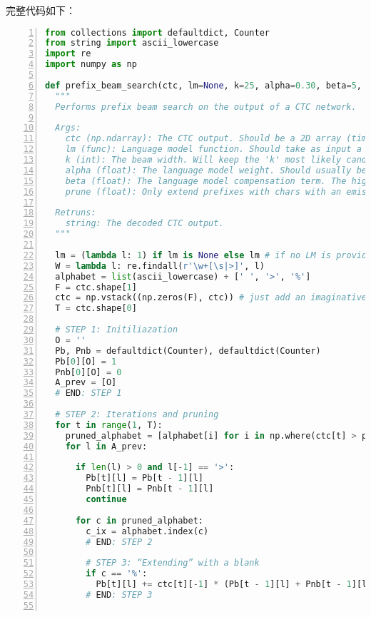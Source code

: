 {{完整代码如下：

\begin{lstlisting}[language = python, numbers=left, 
         numberstyle=\tiny,keywordstyle=\color{blue!70},
         commentstyle=\color{red!50!green!50!blue!50},frame=shadowbox,
         rulesepcolor=\color{red!20!green!20!blue!20},basicstyle=\ttfamily]
from collections import defaultdict, Counter
from string import ascii_lowercase
import re
import numpy as np

def prefix_beam_search(ctc, lm=None, k=25, alpha=0.30, beta=5, prune=0.001):
  """
  Performs prefix beam search on the output of a CTC network.

  Args:
    ctc (np.ndarray): The CTC output. Should be a 2D array (timesteps x alphabet_size)
    lm (func): Language model function. Should take as input a string and output a probability.
    k (int): The beam width. Will keep the 'k' most likely candidates at each timestep.
    alpha (float): The language model weight. Should usually be between 0 and 1.
    beta (float): The language model compensation term. The higher the 'alpha', the higher the 'beta'.
    prune (float): Only extend prefixes with chars with an emission probability higher than 'prune'.

  Retruns:
    string: The decoded CTC output.
  """

  lm = (lambda l: 1) if lm is None else lm # if no LM is provided, just set to function returning 1
  W = lambda l: re.findall(r'\w+[\s|>]', l)
  alphabet = list(ascii_lowercase) + [' ', '>', '%']
  F = ctc.shape[1]
  ctc = np.vstack((np.zeros(F), ctc)) # just add an imaginative zero'th step (will make indexing more intuitive)
  T = ctc.shape[0]

  # STEP 1: Initiliazation
  O = ''
  Pb, Pnb = defaultdict(Counter), defaultdict(Counter)
  Pb[0][O] = 1
  Pnb[0][O] = 0
  A_prev = [O]
  # END: STEP 1

  # STEP 2: Iterations and pruning
  for t in range(1, T):
    pruned_alphabet = [alphabet[i] for i in np.where(ctc[t] > prune)[0]]
    for l in A_prev:
      
      if len(l) > 0 and l[-1] == '>':
        Pb[t][l] = Pb[t - 1][l]
        Pnb[t][l] = Pnb[t - 1][l]
        continue  

      for c in pruned_alphabet:
        c_ix = alphabet.index(c)
        # END: STEP 2
        
        # STEP 3: “Extending” with a blank
        if c == '%':
          Pb[t][l] += ctc[t][-1] * (Pb[t - 1][l] + Pnb[t - 1][l])
        # END: STEP 3
        

\end{lstlisting}}}
